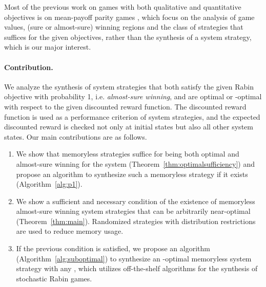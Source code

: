 \documentclass[runningheads,a4paper]{llncs}
\begin{document}
Most of the previous work on games with both qualitative and quantitative objectives is on mean-payoff parity games \cite{chatterjee2005mean, bloem2009better, chatterjee2014perfect}, which focus on the analysis of game values, (sure or almost-sure) winning regions and the class of strategies that suffices for the given objectives, rather than the synthesis of a system strategy, which is our major interest. 










\paragraph{Contribution.}
We analyze the synthesis of system strategies that both satisfy the given Rabin objective with probability 1, i.e. \emph{almost-sure winning}, and are optimal or -optimal with respect to the given discounted reward function. The discounted reward function is used as a performance criterion of system strategies, and the expected discounted reward is checked not only at initial states but also all other system states. Our main contributions are as follows. 

\begin{enumerate}
\item We show that memoryless strategies suffice for being both optimal and almost-sure winning for the system (Theorem~\ref{thm:optimalsufficiency}) and propose an algorithm to synthesize such a memoryless strategy if it exists (Algorithm~\ref{alg:p1}).\item We show a sufficient and necessary condition of the existence of memoryless almost-sure winning system strategies that can be arbitrarily near-optimal (Theorem~\ref{thm:main}). Randomized strategies with distribution restrictions are used to reduce memory usage. 
\item If the previous condition is satisfied, we propose an algorithm (Algorithm~\ref{alg:suboptimal}) to synthesize an -optimal memoryless system strategy with any , which utilizes off-the-shelf algorithms for the synthesis of stochastic Rabin games. 
\end{enumerate}
 
\end{document}
